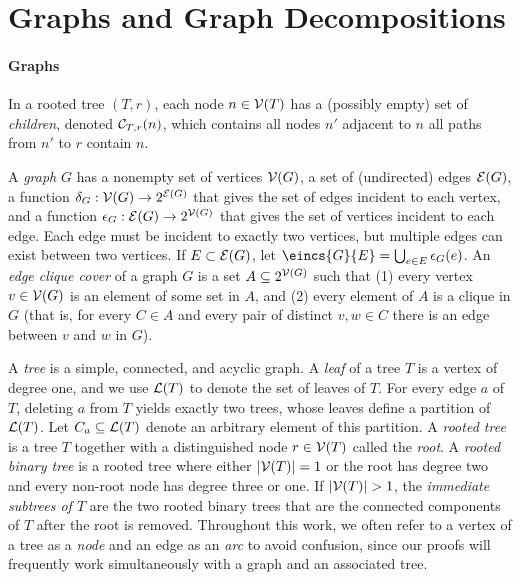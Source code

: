 \section{Graphs and Graph Decompositions}
\label{sec:tensors:prelim}

\paragraph{\textbf{Graphs}}

In a rooted tree $(T, r)$, each node $n \in \mathcal{V}(T)$ has a (possibly empty) set of \emph{children}, denoted $\mathcal{C}_{T,r}(n)$, which contains all nodes $n'$ adjacent to $n$ \st{} all paths from $n'$ to $r$ contain $n$.

A \emph{graph} $G$ has a nonempty set of vertices $\mathcal{V}(G)$, a set of (undirected) edges $\mathcal{E}(G)$, a function $\delta_G: \mathcal{V}(G) \rightarrow 2^{\mathcal{E}(G)}$ that gives the set of edges incident to each vertex, and a function $\epsilon_G: \mathcal{E}(G) \rightarrow 2^{\mathcal{V}(G)}$ that gives the set of vertices incident to each edge. Each edge must be incident to exactly two vertices, but multiple edges can exist between two vertices. If $E \subset \mathcal{E}(G)$, let $\eincs{G}{E} = \bigcup_{e \in E} \einc{G}{e}$. %
An \emph{edge clique cover} of a graph $G$ is a set $A \subseteq 2^{\mathcal{V}(G)}$ such that (1) every vertex $v \in \mathcal{V}(G)$ is an element of some set in $A$, and (2) every element of $A$ is a clique in $G$ (that is, for every $C \in A$ and every pair of distinct $v, w \in C$ there is an edge between $v$ and $w$ in $G$).

A \emph{tree} is a simple, connected, and acyclic graph. A \emph{leaf} of a tree $T$ is a vertex of degree one, and we use $\mathcal{L}(T)$ to denote the set of leaves of $T$. For every edge $a$ of $T$, deleting $a$ from $T$ yields exactly two trees, whose leaves define a partition of $\mathcal{L}(T)$. Let $C_a \subseteq \mathcal{L}(T)$ denote an arbitrary element of this partition. 
A \emph{rooted tree} is a tree $T$ together with a distinguished node $r \in \mathcal{V}(T)$ called the \emph{root}. A \emph{rooted binary tree} is a rooted tree where either $|\mathcal{V}(T)| = 1$ or the root has degree two and every non-root node has degree three or one. If $|\mathcal{V}(T)| > 1$, the \emph{immediate subtrees of $T$} are the two rooted binary trees that are the connected components of $T$ after the root is removed. Throughout this work, we often refer to a vertex of a tree as a \emph{node} and an edge as an \emph{arc} to avoid confusion, since our proofs will frequently work simultaneously with a graph and an associated tree.

